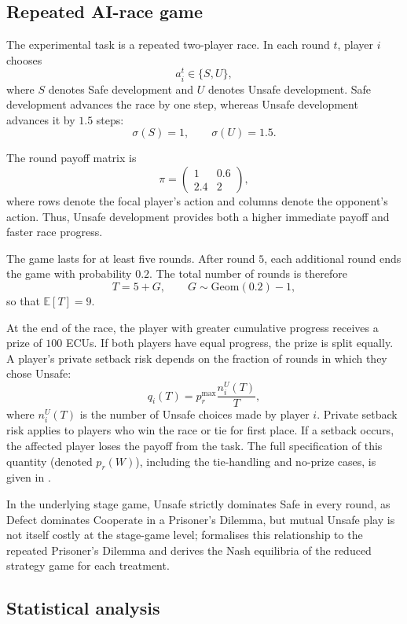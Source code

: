 \documentclass[pdflatex,sn-mathphys-ay]{sn-jnl}
\theoremstyle{thmstyleone}
\theoremstyle{thmstyletwo}
\theoremstyle{thmstylethree}
\begin{document}
\subsection{Repeated AI-race game}

The experimental task is a repeated two-player race. In each round \(t\), player \(i\) chooses
\[
a_i^t\in\{S,U\},
\]
where \(S\) denotes Safe development and \(U\) denotes Unsafe development. Safe development advances the race by one step, whereas Unsafe development advances it by \(1.5\) steps:
\[
\sigma(S)=1,\qquad \sigma(U)=1.5.
\]

The round payoff matrix is
\[
\pi =
\begin{pmatrix}
1 & 0.6\\
2.4 & 2
\end{pmatrix},
\]
where rows denote the focal player's action and columns denote the opponent's action. Thus, Unsafe development provides both a higher immediate payoff and faster race progress.

The game lasts for at least five rounds. After round \(5\), each additional round ends the game with probability \(0.2\). The total number of rounds is therefore
\[
T = 5 + G,
\qquad
G\sim \mathrm{Geom}(0.2)-1,
\]
so that \(\mathbb{E}[T]=9\).

At the end of the race, the player with greater cumulative progress receives a prize of \(100\) ECUs. If both players have equal progress, the prize is split equally. A player's private setback risk depends on the fraction of rounds in which they chose Unsafe:
\[
q_i(T)=p_r^{\max}\frac{n_i^U(T)}{T},
\]
where \(n_i^U(T)\) is the number of Unsafe choices made by player \(i\). Private setback risk applies to players who win the race or tie for first place. If a setback occurs, the affected player loses the payoff from the task. The full specification of this quantity (denoted \(p_r(W)\)), including the tie-handling and no-prize cases, is given in .

In the underlying stage game, Unsafe strictly dominates Safe in every round, as Defect dominates Cooperate in a Prisoner's Dilemma, but mutual Unsafe play is not itself costly at the stage-game level;  formalises this relationship to the repeated Prisoner's Dilemma and derives the Nash equilibria of the reduced strategy game for each treatment.

\subsection{Statistical analysis}
\end{document}
